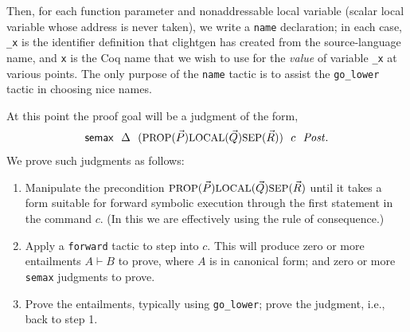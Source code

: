 \documentclass[12pt,fleqn,openany,oneside,showtrims]{memoir}
\begin{document}
Then, for each function parameter and nonaddressable local variable 
(scalar local variable whose address is never taken), we write a
\lstinline{name} declaration; in each case, \lstinline{_x} is the
identifier definition that clightgen has created from the source-language
name, and \lstinline{x} is the Coq name that we wish to use for
the \emph{value} of variable \lstinline{_x} at various points.
The only purpose of the \lstinline{name}
tactic is to assist the \lstinline{go_lower} tactic in choosing nice names.

At this point the proof goal will be a judgment of the form,
\[
\mathsf{semax}~~\Delta~~(\mbox{\small PROP}(\vec{P}) \mbox{\small LOCAL}(\vec{Q}) \mbox{\small SEP}(\vec{R}))~~c~~\mathit{Post}.
\]
We prove such judgments as follows:
\begin{enumerate}
\item Manipulate the precondition 
$\mbox{\small PROP}(\vec{P}) \mbox{\small LOCAL}(\vec{Q}) \mbox{\small SEP}(\vec{R})$
until it takes a form suitable for forward symbolic execution
through the first statement in the command $c$.  (In this we are
effectively using the rule of consequence.)
\item Apply a \lstinline{forward} tactic to step into $c$.
This will produce zero or more entailments $A\vdash B$ to prove,
where $A$ is in canonical form; 
and zero or more 
\lstinline{semax} judgments to prove.
\item Prove the entailments, typically using \lstinline{go_lower};
prove the judgment, i.e., back to step 1.
\end{enumerate}
\end{document}
